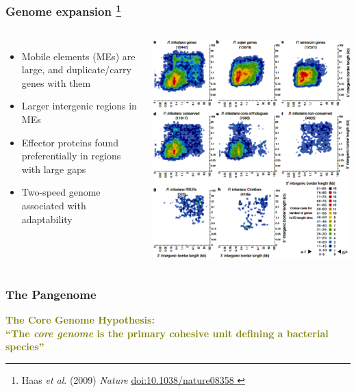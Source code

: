 %
\begin{frame}
  \frametitle{Genome expansion
    \footnote{\tiny{Haas \textit{et al}. (2009) \textit{Nature} \href{http://dx.doi.org/10.1038/nature08358
}{doi:10.1038/nature08358
  }}}
}
  \begin{columns}[T] 
      \begin{itemize}
        \item Mobile elements (MEs) are large, and duplicate/carry genes with them
        \item \textcolor{hutton_green}{Larger intergenic regions in MEs}
        \item \textcolor{hutton_blue}{Effector proteins found preferentially in regions with large gaps}
        \item \textcolor{hutton_purple}{Two-speed genome associated with adaptability}
      \end{itemize}  
        \includegraphics[width=\textwidth]{images/pi_two_speed}
    \end{columns}
\end{frame}

%
\begin{frame}
  \frametitle{The Pangenome
  }
  \Large{
    \textcolor{olive}{
      \textbf{
      The Core Genome Hypothesis: \\
      ``The \textit{core genome} is the primary cohesive unit defining a bacterial species''
      }
    }
  }
\end{frame}

